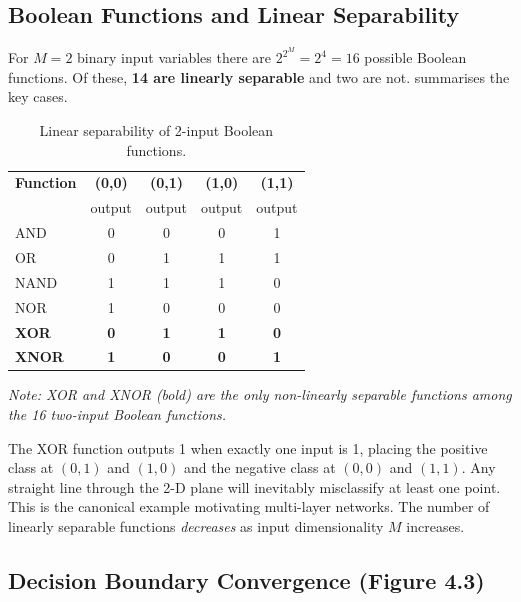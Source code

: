\documentclass[12pt,a4paper]{article}
\begin{document}
\subsection{Boolean Functions and Linear Separability}
\label{subsec:boolean}

For $M = 2$ binary input variables there are $2^{2^M} = 2^4 = 16$
possible Boolean functions.  Of these, \textbf{14 are linearly separable}
and two are not.   summarises the key cases.

\begin{table}[ht]
\centering
\caption{Linear separability of 2-input Boolean functions.}
\label{tab:boolean-gates}
\begin{tabular}{lcccc}
\toprule
\textbf{Function} & \textbf{(0,0)} & \textbf{(0,1)} & \textbf{(1,0)} & \textbf{(1,1)} \\
& output & output & output & output \\
\midrule
AND   & 0 & 0 & 0 & 1 \\
OR    & 0 & 1 & 1 & 1 \\
NAND  & 1 & 1 & 1 & 0 \\
NOR   & 1 & 0 & 0 & 0 \\
\midrule
\textbf{XOR}  & \textbf{0} & \textbf{1} & \textbf{1} & \textbf{0} \\
\textbf{XNOR} & \textbf{1} & \textbf{0} & \textbf{0} & \textbf{1} \\
\bottomrule
\end{tabular}

\vspace{4pt}
\small\textit{Note: XOR and XNOR (bold) are the only non-linearly separable
functions among the 16 two-input Boolean functions.}
\end{table}

\begin{keyinsight}[title=Key Insight -- XOR and XNOR Are Not Linearly Separable]
The XOR function outputs 1 when exactly one input is 1, placing the
positive class at $(0,1)$ and $(1,0)$ and the negative class at $(0,0)$
and $(1,1)$.  Any straight line through the 2-D plane will inevitably
misclassify at least one point.  This is the canonical example motivating
multi-layer networks.  The number of linearly separable functions
\emph{decreases} as input dimensionality $M$ increases.
\end{keyinsight}

\subsection{Decision Boundary Convergence (Figure 4.3)}
\label{subsec:convergence-diagram}
\end{document}
